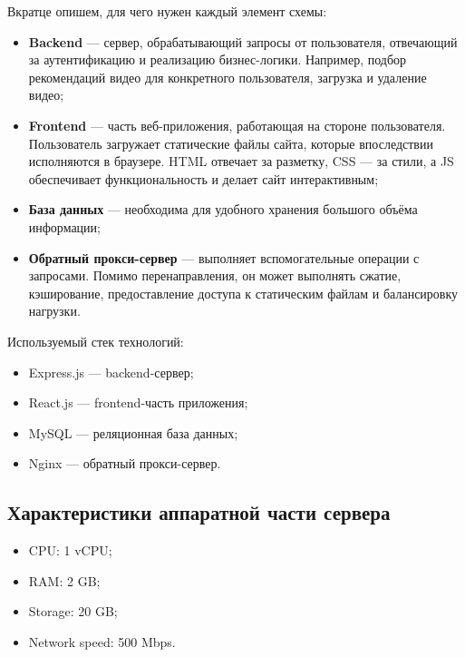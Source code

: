 \documentclass[12pt]{article}
\begin{document}
Вкратце опишем, для чего нужен каждый элемент схемы:

\begin{itemize}
    \item \textbf{Backend} — сервер, обрабатывающий запросы от пользователя, отвечающий за аутентификацию и реализацию бизнес-логики.  
    Например, подбор рекомендаций видео для конкретного пользователя, загрузка и удаление видео;
    
    \item \textbf{Frontend} — часть веб-приложения, работающая на стороне пользователя.  
    Пользователь загружает статические файлы сайта, которые впоследствии исполняются в браузере.  
    HTML отвечает за разметку, CSS — за стили, а JS обеспечивает функциональность и делает сайт интерактивным;
    
    \item \textbf{База данных} — необходима для удобного хранения большого объёма информации;

    \item \textbf{Обратный прокси-сервер} — выполняет вспомогательные операции с запросами.  
    Помимо перенаправления, он может выполнять сжатие, кэширование, предоставление доступа к статическим файлам и балансировку нагрузки.
\end{itemize}

Используемый стек технологий:

\begin{itemize}
    \item Express.js — backend-сервер;
    \item React.js — frontend-часть приложения;
    \item MySQL — реляционная база данных;
    \item Nginx — обратный прокси-сервер.
\end{itemize}

\subsection{Характеристики аппаратной части сервера}

\begin{itemize}
    \item CPU: 1 vCPU;
    \item RAM: 2 GB;
    \item Storage: 20 GB;
    \item Network speed: 500 Mbps.
\end{itemize}
\end{document}
